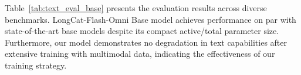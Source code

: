 \documentclass{article}
\begin{document}
Table~\ref{tab:text_eval_base} presents the evaluation results across diverse benchmarks. 
LongCat-Flash-Omni Base model achieves performance on par with state-of-the-art base models despite its compact active/total parameter size. Furthermore, our model demonstrates no degradation in text capabilities after extensive training with multimodal data, indicating the effectiveness of our training strategy.
\end{document}
